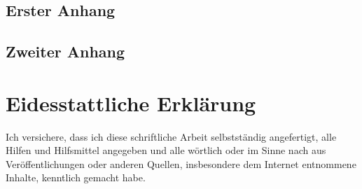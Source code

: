 \documentclass[12pt,a4paper,oneside,ngerman]{report}
\begin{document}
\section{Erster Anhang}



\section{Zweiter Anhang}




\chapter*{Eidesstattliche Erklärung}
\thispagestyle{empty} %

Ich versichere, dass ich diese schriftliche Arbeit selbstständig
angefertigt, alle Hilfen und Hilfsmittel angegeben und alle wörtlich
oder im Sinne nach aus Veröffentlichungen oder anderen Quellen,
insbesondere dem Internet entnommene Inhalte, kenntlich gemacht habe.

\vspace{1.5cm}
\end{document}
